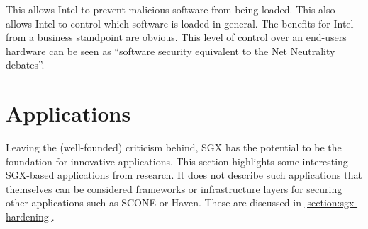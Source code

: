 \begin{description}
This allows Intel to prevent malicious software from being loaded.\label{ID_6860923}
This also allows Intel to control which software is loaded in general.\label{ID_1791148432}
The benefits for Intel from a business standpoint are obvious.\label{ID_1766310969}
This level of control over an end-users hardware can be seen as ``software security equivalent to the Net Neutrality debates''.\cite[]{sgx-explained}\label{ID_1069483865}
\end{description}\label{ID_1258675258}

\section{Applications\label{ID_54364136}\label{section:sgx-apps}}
Leaving the (well-founded) criticism behind, SGX has the potential to be the foundation for innovative applications.\label{ID_1994267622}
This section highlights some interesting SGX-based applications from research.\label{ID_492049202}
It does not describe such applications that themselves can be considered frameworks or infrastructure layers for securing other applications such as SCONE or Haven. These are discussed in \autoref{section:sgx-hardening}.\label{ID_110180016}
